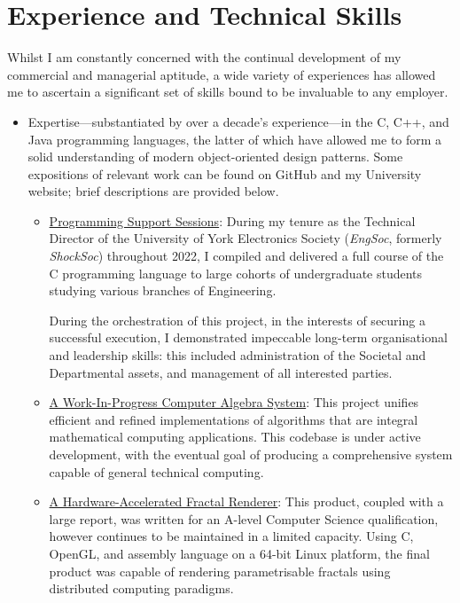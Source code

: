 \documentclass{article}
\newcommand\githublink[2]{\href{https://github.com/oliverdixon/#1}{#2}}
\newcommand\weblink[2]{\href{https://www-users.york.ac.uk/~od641/#1}{#2}}
\begin{document}
\section{Experience and Technical Skills}
Whilst I am constantly concerned with the continual development of my commercial
and managerial aptitude, a wide variety of experiences has allowed me to
ascertain a significant set of skills bound to be invaluable to any employer.
\begin{itemize}
  \item Expertise---substantiated by over a decade's experience---in the C, C++,
  and Java programming languages, the latter of which have allowed me to form a
  solid understanding of modern object-oriented design patterns. Some
  expositions of relevant work can be found on GitHub and my University website;
  brief descriptions are provided below.
  \begin{itemize}
    \item \weblink{pss}{Programming Support Sessions}: During my tenure as the
    Technical Director of the University of York Electronics Society
    (\textit{EngSoc}, formerly \textit{ShockSoc}) throughout 2022, I compiled
    and delivered a full course of the C programming language to large cohorts
    of undergraduate students studying various branches of Engineering.

    During the orchestration of this project, in the interests of securing a
    successful execution, I demonstrated impeccable long-term organisational and
    leadership skills: this included administration of the Societal and
    Departmental assets, and management of all interested parties.

    \item \githublink{calculator-demo}{A Work-In-Progress Computer Algebra
    System}: This project unifies efficient and refined implementations of
    algorithms that are integral mathematical computing applications.  This
    codebase is under active development, with the eventual goal of producing a
    comprehensive system capable of general technical computing.

    \item \weblink{fractal}{A Hardware-Accelerated Fractal Renderer}: This
    product, coupled with a large report, was written for an A-level Computer
    Science qualification, however continues to be maintained in a limited
    capacity. Using C, OpenGL, and assembly language on a 64-bit Linux platform,
    the final product was capable of rendering parametrisable fractals using
    distributed computing paradigms.


\end{itemize}
\end{itemize}
\end{document}
